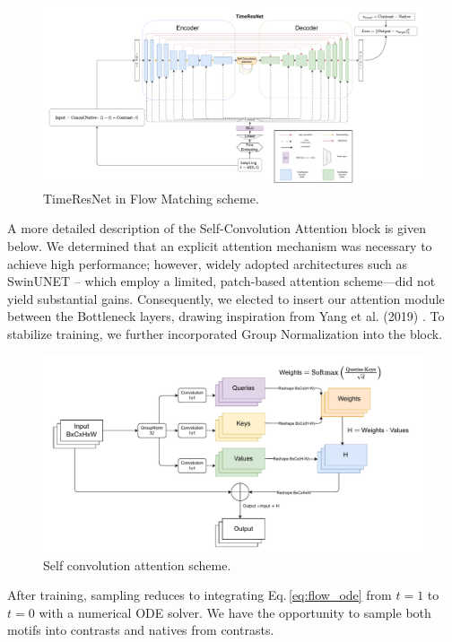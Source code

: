 \documentclass{article}
\begin{document}
\begin{figure}[h!]
  \centering
  \includegraphics[width=0.95\linewidth]{images/timeresnet.pdf}
  \caption{TimeResNet in Flow Matching scheme.}
\end{figure}

A more detailed description of the Self-Convolution Attention block is given below. We determined that an explicit attention mechanism was necessary to achieve high performance; however, widely adopted architectures such as SwinUNET \citep{cao2022swin} -- which employ a limited, patch-based attention scheme—did not yield substantial gains. Consequently, we elected to insert our attention module between the Bottleneck layers, drawing inspiration from Yang et al. (2019) \citep{yang-etal-2019-convolutional}. To stabilize training, we further incorporated Group Normalization \citep{wu2018group} into the block.

\begin{figure}[h!]
  \centering
  \includegraphics[width=0.85\linewidth]{images/self_attention.pdf}
  \caption{Self convolution attention scheme.}
\end{figure}

After training, sampling reduces to integrating
Eq.\,\eqref{eq:flow_ode} from $t=1$ to $t=0$ with a numerical ODE solver. We have the opportunity to sample both motifs into contrasts and natives from contrasts.
\end{document}
